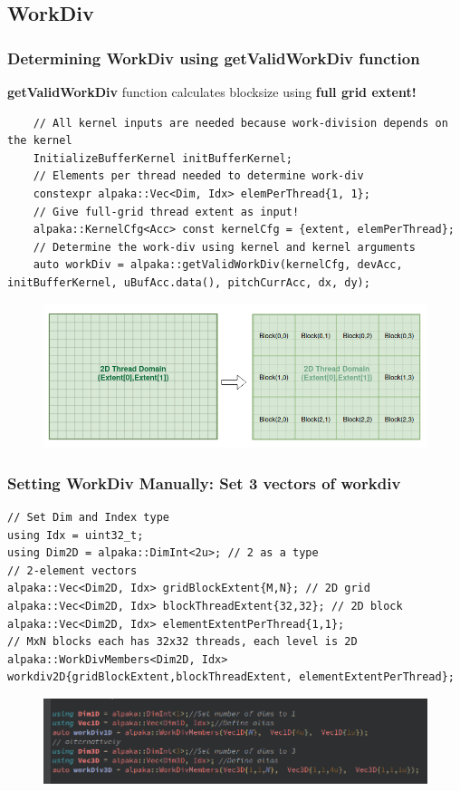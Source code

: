 \documentclass[9pt]{beamer}
\begin{document}
\subsection{WorkDiv}
\begin{frame}[fragile]
\frametitle{Determining WorkDiv using getValidWorkDiv function}
\textbf{getValidWorkDiv} function calculates blocksize using \textbf{full grid extent!}
\lstset{basicstyle=\ttfamily\scriptsize}
\begin{lstlisting}
    // All kernel inputs are needed because work-division depends on the kernel
    InitializeBufferKernel initBufferKernel;
    // Elements per thread needed to determine work-div
    constexpr alpaka::Vec<Dim, Idx> elemPerThread{1, 1};
    // Give full-grid thread extent as input!
    alpaka::KernelCfg<Acc> const kernelCfg = {extent, elemPerThread};
    // Determine the work-div using kernel and kernel arguments
    auto workDiv = alpaka::getValidWorkDiv(kernelCfg, devAcc, initBufferKernel, uBufAcc.data(), pitchCurrAcc, dx, dy);
\end{lstlisting}
\begin{figure}
    \centering
    \includegraphics[width=0.75\linewidth]{Screenshot from 2024-10-18 15-16-26.png}
\end{figure}
\end{frame}


\begin{frame}[fragile]
\frametitle{Setting WorkDiv Manually: Set 3 vectors of workdiv}
\begin{lstlisting}
// Set Dim and Index type
using Idx = uint32_t;
using Dim2D = alpaka::DimInt<2u>; // 2 as a type
// 2-element vectors
alpaka::Vec<Dim2D, Idx> gridBlockExtent{M,N}; // 2D grid
alpaka::Vec<Dim2D, Idx> blockThreadExtent{32,32}; // 2D block
alpaka::Vec<Dim2D, Idx> elementExtentPerThread{1,1};
// MxN blocks each has 32x32 threads, each level is 2D
alpaka::WorkDivMembers<Dim2D, Idx> workdiv2D{gridBlockExtent,blockThreadExtent, elementExtentPerThread};
\end{lstlisting}
\begin{figure}
    \centering
    \includegraphics[width=0.75\linewidth]{workdivManual.png}
\end{figure}

\end{frame}
\end{document}
